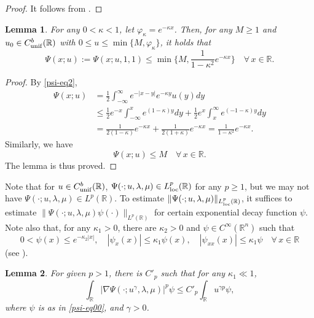 \documentclass[11pt]{article} %
\newtheorem{lemma}{Lemma}[section]
\theoremstyle{remark}
\theoremstyle{remark}
\numberwithin{equation}{section}
\numberwithin{figure}{section}
\numberwithin{table}{section}
\def\R{\mathbb R}
\newcommand\RR{\ensuremath{\mathbb{R}}}
\begin{document}
\begin{proof}
It follows from \cite[Lemma 2.2]{SaShXu2019}.
\end{proof}

\begin{lemma}
\label{prelim-v-lm3}
For any $0<\kappa<1$, let $\varphi_\kappa =e^{-\kappa x}$. Then,  for any $M\ge 1$ and 
$u_0\in C_{\rm unif}^b(\RR)$ with  $0\le u\le \min\{M,\varphi_\kappa\}$,  it holds that
$$
\Psi(x;u):=\Psi(x;u,1,1)\le \min\big\{M,\frac{1}{1-\kappa^2} e^{-\kappa x}\big\}\quad \forall\, x\in\RR.
$$
\end{lemma}

\begin{proof}
By \eqref{psi-eq2},
\begin{align*}
\Psi(x;u)&=\frac{1}{2}\int_{-\infty}^\infty e^{-|x-y|} e^{-\kappa y} u(y)dy\\
&\le \frac{1}{2}e^{-x}\int_{-\infty}^x e^{(1-\kappa)y}dy+\frac{1}{2} e^x \int_x^\infty e^{(-1-\kappa)y}dy\\
&=\frac{1}{2(1-\kappa)} e^{-\kappa x}+\frac{1}{2(1+\kappa)} e^{-\kappa x}=\frac{1}{1-\kappa^2} e^{-\kappa x}.
\end{align*}
Similarly, we have
$$
\Psi(x;u)\le M\quad \forall\, x\in\RR.
$$
The lemma is thus proved.
\end{proof}


Note that for $u\in C_{\rm unif}^b(\RR)$,  $\Psi(\cdot;u,\lambda,\mu)\in L_{\rm loc}^p(\RR)$ for any $p\ge 1$, but we may not have $\Psi(\cdot;u,\lambda,\mu)\in L^p(\RR)$. To estimate $\|\Psi(\cdot;u,\lambda,\mu)\|_{L_{\rm loc}^p(\RR)}$, it suffices to estimate
$\|\Psi(\cdot;u,\lambda,\mu)\psi(\cdot)\|_{L^p(\RR)}$ for certain  exponential decay function $\psi$. 
Note also that,     for  any {$\kappa_1>0$,  there are  $\kappa_2>0$} and
     $\psi\in C^\infty(\R^n)$  such that
    \begin{equation}\label{psi-eq00}
        0<\psi(x)\le e^{-\kappa_2|x|},\quad | \psi_x(x)|\le \kappa_1 \psi(x),\quad | \psi_{xx} (x)|\le \kappa_1\psi \quad  \forall\, x\in\RR
    \end{equation}
(see \cite[Lemma 2.4]{HaShZh2024}). 

\begin{lemma}
\label{prelim-v-lm4}
For given $p>1$, 
there is $C'_p$ such that for any $\kappa_1\ll  1$,
$$
\int_{\RR} |\nabla \Psi(\cdot;u^\gamma,\lambda,\mu) |^{p}\psi\le C'_p \int_{\RR} u^{\gamma p}\psi,
$$
where $\psi$ is as in \eqref{psi-eq00}, and $\gamma>0$.
\end{lemma}
\end{document}
